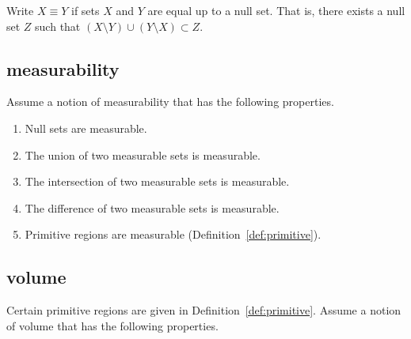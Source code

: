 Write $X\equiv Y$ if sets $X$ and $Y$ are equal up to a null set.
That is, there exists a null set $Z$ such that
   $(X\setminus Y) \cup (Y\setminus X) \subset Z$.

\subsection{measurability}\label{sec:measure}

Assume a notion of measurability that has the following properties.

\begin{enumerate}%
 \item Null sets are measurable.
 \item The union of two measurable sets is measurable.
 \item The intersection of two measurable sets is measurable.
 \item The difference of two measurable sets is measurable.
 \item Primitive regions are measurable (Definition~\ref{def:primitive}).
\end{enumerate}

\subsection{volume}\label{sec:volume}

Certain primitive regions are given in Definition~\ref{def:primitive}.
Assume a notion of volume that has the following properties.


